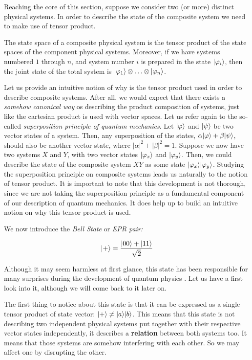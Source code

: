 Reaching the core of this section, suppose we consider two (or more) distinct physical systems. In order to describe the state of the composite system we need to make use of tensor product.

\begin{postulate}
	The state space of a composite physical system is the tensor product of the state spaces of the component physical systems. Moreover, if we have systems numbered $1$ through $n$, and system number $i$ is prepared in the state $|\varphi_i\rangle$, then the joint state of the total system is $|\varphi_1\rangle \otimes \dotsc \otimes |\varphi_n\rangle$.
\end{postulate}

Let us provide an intuitive notion of why is the tensor product used in order to describe composite systems. After all, we would expect that there exists a \emph{somehow canonical way} os describing the product composition of systems, just like the cartesian product is used with vector spaces. Let us refer again to the so-called \emph{superposition principle of quantum mechanics}. Let $|\varphi\rangle$ and $|\psi\rangle$ be two vector states of a system. Then, any superposition of the states, $\alpha|\varphi\rangle + \beta|\psi\rangle$, should also be another vector state, where $|\alpha|^2 + |\beta|^2 = 1$. Suppose we now have two systems $X$ and $Y$, with two vector states $|\varphi_x\rangle$ and $|\varphi_y\rangle$. Then, we could describe the state of the composite system $XY$ as some state $|\varphi_x\rangle|\varphi_y\rangle$. Studying the superposition principle on composite systems leads us naturally to the notion of tensor product. It is important to note that this development is not thorough, since we are not taking the superposition principle as a fundamental component of our description of quantum mechanics. It does help up to build an intuitive notion on why this tensor product is used.

We now introduce the \emph{Bell State} or \emph{EPR pair:}

$$ |+\rangle = \frac{ |00\rangle + |11\rangle }{ \sqrt 2 } $$

Although it may seem harmless at first glance, this state has been responsible for many surprises during the development of quantum physics \cite{Bellt1964}. Let us have a first look into it, although we will come back to it later on.

The first thing to notice about this state is that it can be expressed as a single tensor product of state vector: $|+\rangle \neq |a\rangle|b\rangle$. This means that this state is not describing two independent physical systems put together with their respective vector states independently, it describes a \textbf{relation} between both systems too. It means that those systems are somehow interfering with each other. So we may affect one by disrupting the other.

